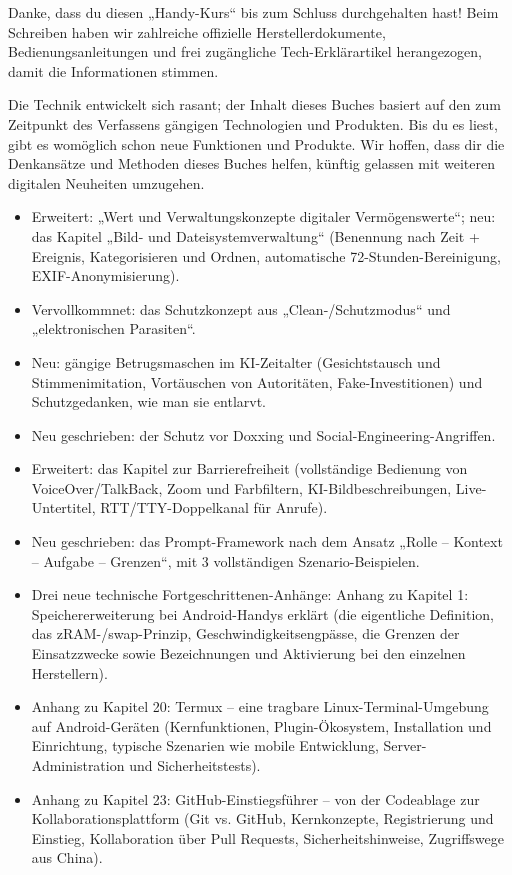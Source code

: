 
Danke, dass du diesen „Handy-Kurs“ bis zum Schluss durchgehalten hast! Beim Schreiben haben wir zahlreiche offizielle Herstellerdokumente, Bedienungsanleitungen und frei zugängliche Tech-Erklärartikel herangezogen, damit die Informationen stimmen.

Die Technik entwickelt sich rasant; der Inhalt dieses Buches basiert auf den zum Zeitpunkt des Verfassens gängigen Technologien und Produkten. Bis du es liest, gibt es womöglich schon neue Funktionen und Produkte. Wir hoffen, dass dir die Denkansätze und Methoden dieses Buches helfen, künftig gelassen mit weiteren digitalen Neuheiten umzugehen.


\begin{itemize}
  \item Erweitert: „Wert und Verwaltungskonzepte digitaler Vermögenswerte“; neu: das Kapitel „Bild- und Dateisystemverwaltung“ (Benennung nach Zeit + Ereignis, Kategorisieren und Ordnen, automatische 72-Stunden-Bereinigung, EXIF-Anonymisierung).
  \item Vervollkommnet: das Schutzkonzept aus „Clean-/Schutzmodus“ und „elektronischen Parasiten“.
  \item Neu: gängige Betrugsmaschen im KI-Zeitalter (Gesichtstausch und Stimmenimitation, Vortäuschen von Autoritäten, Fake-Investitionen) und Schutzgedanken, wie man sie entlarvt.
  \item Neu geschrieben: der Schutz vor Doxxing und Social-Engineering-Angriffen.
  \item Erweitert: das Kapitel zur Barrierefreiheit (vollständige Bedienung von VoiceOver/TalkBack, Zoom und Farbfiltern, KI-Bildbeschreibungen, Live-Untertitel, RTT/TTY-Doppelkanal für Anrufe).
  \item Neu geschrieben: das Prompt-Framework nach dem Ansatz „Rolle – Kontext – Aufgabe – Grenzen“, mit 3 vollständigen Szenario-Beispielen.
  \item Drei neue technische Fortgeschrittenen-Anhänge: Anhang zu Kapitel 1: Speichererweiterung bei Android-Handys erklärt (die eigentliche Definition, das zRAM-/swap-Prinzip, Geschwindigkeitsengpässe, die Grenzen der Einsatzzwecke sowie Bezeichnungen und Aktivierung bei den einzelnen Herstellern).
  \item Anhang zu Kapitel 20: Termux – eine tragbare Linux-Terminal-Umgebung auf Android-Geräten (Kernfunktionen, Plugin-Ökosystem, Installation und Einrichtung, typische Szenarien wie mobile Entwicklung, Server-Administration und Sicherheitstests).
  \item Anhang zu Kapitel 23: GitHub-Einstiegsführer – von der Codeablage zur Kollaborationsplattform (Git vs. GitHub, Kernkonzepte, Registrierung und Einstieg, Kollaboration über Pull Requests, Sicherheitshinweise, Zugriffswege aus China).
\end{itemize}

